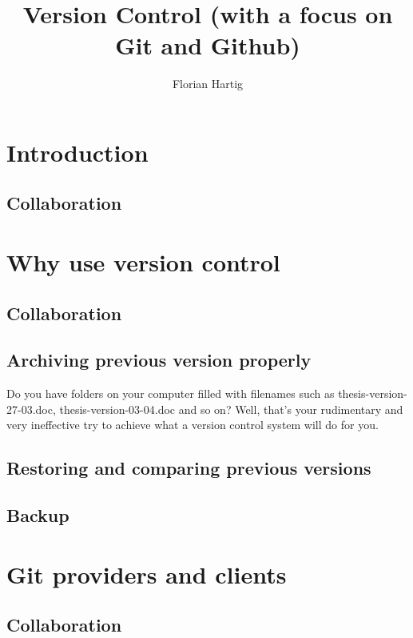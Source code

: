 \documentclass{tufte-book}
\title{Version Control (with a focus on Git and Github)}
\author{Florian Hartig}
\begin{document}
\let\cleardoublepage\clearpage
\maketitle
\newpage
\tableofcontents

\chapter{Introduction}


\section{Collaboration}


\chapter{Why use version control}


\section{Collaboration}


\section{Archiving previous version properly}

Do you have folders on your computer filled with filenames such as thesis-version-27-03.doc, thesis-version-03-04.doc and so on? Well, that's your rudimentary and very ineffective try to achieve what a version control system will do for you. 


\section{Restoring and comparing previous versions}


\section{Backup}


\chapter{Git providers and clients}

\section{Collaboration}
\end{document}
